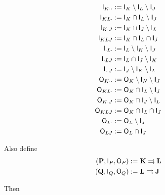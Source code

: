 \begin{align}
    \mathsf{I}_{K\cdot\cdot}&:=\mathsf{I}_K\setminus\mathsf{I}_L\setminus\mathsf{I}_J\\
    \mathsf{I}_{KL\cdot}&:=\mathsf{I}_K\cap\mathsf{I}_L\setminus\mathsf{I}_J\\
    \mathsf{I}_{K\cdot J}&:=\mathsf{I}_K\cap\mathsf{I}_J\setminus\mathsf{I}_L\\
    \mathsf{I}_{KL J}&:=\mathsf{I}_K\cap \mathsf{I}_L\cap\mathsf{I}_J\\
    \mathsf{I}_{\cdot L \cdot} &:= \mathsf{I}_L\setminus\mathsf{I}_K\setminus \mathsf{I}_J\\
    \mathsf{I}_{\cdot L J} &:= \mathsf{I}_L\cap \mathsf{I}_J\setminus \mathsf{I}_K\\
    \mathsf{I}_{\cdot\cdot J} &:= \mathsf{I}_J\setminus\mathsf{I}_K\setminus\mathsf{I}_L\\
    \mathsf{O}_{K\cdot\cdot} &:= \mathsf{O}_K\setminus\mathsf{I}_N\setminus\mathsf{I}_J\\
    \mathsf{O}_{KL\cdot} &:= \mathsf{O}_K\cap\mathsf{I}_L\setminus\mathsf{I}_J\\
    \mathsf{O}_{K\cdot J} &:= \mathsf{O}_K\cap\mathsf{I}_J\setminus\mathsf{I}_L\\
    \mathsf{O}_{KLJ} &:= \mathsf{O}_K\cap\mathsf{I}_L\cap\mathsf{I}_J\\
    \mathsf{O}_{L\cdot} &:= \mathsf{O}_L\setminus\mathsf{I}_J\\
    \mathsf{O}_{LJ} &:= \mathsf{O}_L\cap\mathsf{I}_J
\end{align}

Also define
\begin{align}
    (\mathbf{P},\mathsf{I}_P,\mathsf{O}_P)&:=\mathbf{K}\rightrightarrows \mathbf{L}\\
    (\mathbf{Q},\mathsf{I}_Q,\mathsf{O}_Q)&:=\mathbf{L}\rightrightarrows \mathbf{J}
\end{align}

Then

